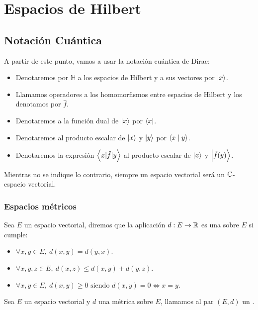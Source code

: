 \chapter{Espacios de Hilbert}

\section{Notación Cuántica}
A partir de este punto, vamos a usar la notación cuántica de Dirac:
\begin{itemize}
  \item Denotaremos por $\mathbb{H}$ a los espacios de Hilbert y a sus vectores por $\left\lvert x\right\rangle$.
  \item Llamamos operadores a los homomorfismos entre espacios de Hilbert y los denotamos por $\hat{f}$.
  \item Denotaremos a la función dual de $\left\lvert x\right\rangle$ por $\left\langle x\right\rvert$.
  \item Denotaremos al producto escalar de $\left\lvert x\right\rangle$ y $\left\lvert y\right\rangle$ por $\left\langle x\mid y\right\rangle$.
  \item Denotaremos la expresión $\left\langle x|\hat{f}|y\right\rangle$ al producto escalar de ${\left\lvert x\right\rangle}$ y $\left\lvert\hat{f}(y)\right\rangle$.
\end{itemize}

Mientras no se indique lo contrario, siempre un espacio vectorial será un $\mathbb{C}$-espacio vectorial.

\subsection{Espacios métricos}
\begin{definicion}
  \label{distancia}
  Sea $E$ un espacio vectorial, diremos que la aplicación $d:E \rightarrow \mathbb{R}$ es una  sobre $E$ si cumple:
  \begin{itemize}
    \item $\forall x,y \in E,\ d(x,y)=d(y,x)$.
    \item $\forall x,y,z \in E,\ d(x,z)\leq d(x, y)+d(y, z)$.
    \item $\forall x, y \in E,\ d(x,y)\geq 0 \text{ siendo } d(x,y)=0\Leftrightarrow x = y$.
  \end{itemize}
\end{definicion}

\begin{definicion}
  \label{espacio_metrico}
  Sea $E$ un espacio vectorial y $d$ una métrica sobre $E$, llamamos al par $(E, d)$ un .
\end{definicion}

